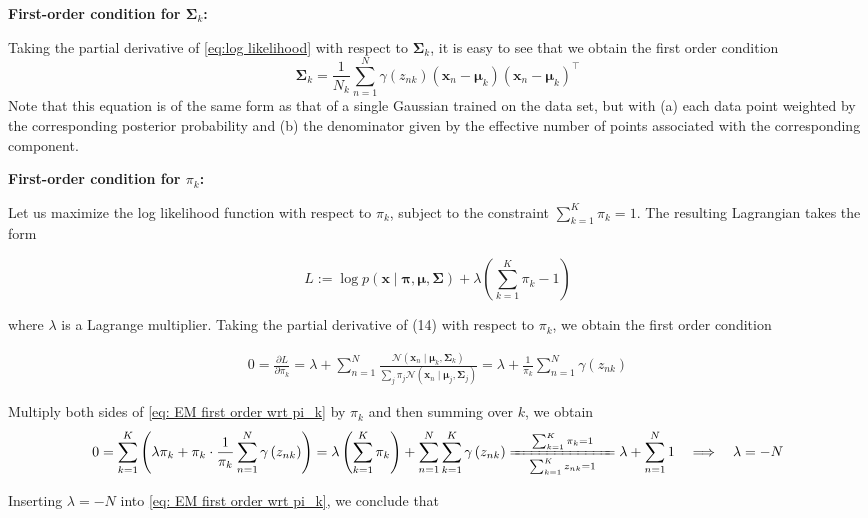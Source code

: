 \documentclass[11pt]{article}
\theoremstyle{plain} %
\newenvironment{topic}
{\color{C2}\normalfont\begin{framed}\begingroup }
  {\endgroup\end{framed}}
\theoremstyle{remark}
\begin{document}
\begin{topic}
\begin{itemize}
\end{itemize}

\textbf{First-order condition for $\boldsymbol{\Sigma}_{k}$:}

Taking the partial derivative of \cref{eq:log likelihood} with respect to $\boldsymbol{\Sigma}_{k}$,
it is easy to see that we obtain the first order condition
$$
  \boldsymbol{\Sigma}_{k}=\frac{1}{N_{k}} \sum_{n=1}^{N} \gamma\left(z_{n k}\right)\left(\mathbf{x}_{n}-\boldsymbol{\mu}_{k}\right)\left(\mathbf{x}_{n}-\boldsymbol{\mu}_{k}\right)^\top
$$
Note that this equation is of the same form as that of a single Gaussian trained on the
data set, but with (a) each data point weighted by the corresponding posterior
probability and (b) the denominator given by the effective number of points
associated with the corresponding component.

\textbf{First-order condition for $\pi_{k}$:}

Let us maximize the log likelihood function with respect to $\pi_{k}$, subject to the constraint $\sum_{k=1}^K \pi_{k} = 1$.
The resulting Lagrangian takes the form

$$
  L:=\log p(\mathbf{x} \mid \boldsymbol{\pi}, \boldsymbol{\mu}, \boldsymbol{\Sigma})+\lambda\left(\sum_{k=1}^{K} \pi_{k}-1\right)
$$

where $\lambda$ is a Lagrange multiplier. Taking the partial derivative of (14)
with respect to $\pi_{k}$, we obtain the first order condition

\begin{align}
  0 = \frac{\partial L}{\partial \pi_k}
  =\lambda+\sum_{n=1}^{N} \frac{\mathcal{N}\left(\mathbf{x}_{n} \mid \boldsymbol{\mu}_{k}, \boldsymbol{\Sigma}_{k}\right)}{\sum_{j} \pi_{j} \mathcal{N}\left(\mathbf{x}_{n} \mid \boldsymbol{\mu}_{j}, \boldsymbol{\Sigma}_{j}\right)}
  =\lambda +  \frac{1}{\pi_k}\sum_{n=1}^{N}\gamma\left(z_{n k}\right)
  \label{eq: EM first order wrt pi_k}
\end{align}


Multiply both sides of \cref{eq: EM first order wrt pi_k} by $\pi_{k}$ and then summing over $k$, we obtain
$$
  0 =\sum_{k=1}^K \left(\lambda\pi_k + \pi_k \cdot \frac{1}{\pi_k}\sum_{n=1}^{N} \gamma\left(z_{n k}\right)\right)
  = \lambda\left(\sum_{k=1}^K \pi_k\right) + \sum_{n=1}^{N} \sum_{k=1}^K \gamma\left(z_{n k}\right)
  \xlongequal[\quad \sum_{k=1}^K z_{n k} = 1\quad ]{\quad \sum_{k=1}^K \pi_{k} = 1\quad }
  \lambda + \sum_{n=1}^{N} 1
  \quad \Longrightarrow\quad
  \lambda = -N
$$

Inserting $\lambda = -N$ into \cref{eq: EM first order wrt pi_k},  we conclude that


\end{topic}
\end{document}
